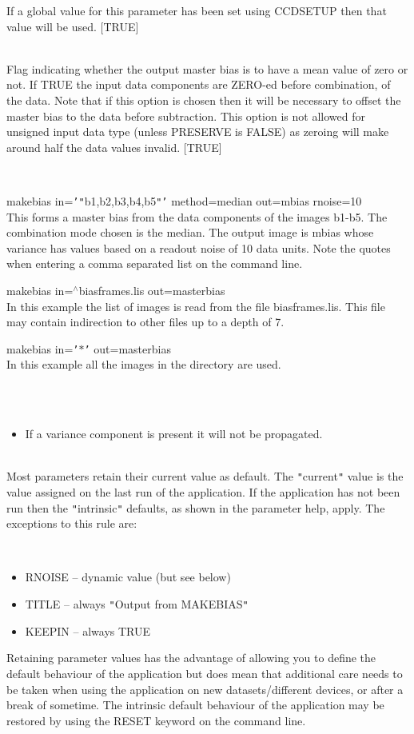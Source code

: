 \documentclass[twoside,11pt]{article}
\renewcommand{\_}{\texttt{\symbol{95}}}
\newcommand{\qt}[1]{{\tt "}#1{\tt "}}
\newcommand{\qs}[1]{{\tt '}#1{\tt '}}
\newcommand{\sstexamples}[1]{
   \item[Examples:] \mbox{} \\
   \vspace{-3.5ex}
   \begin{description}
      #1
   \end{description}
}
\newcommand{\sstsubsection}[1]{ \item[{#1}] \mbox{} \\}
\newcommand{\sstexamplesubsection}[2]{\sloppy \item{\ssttt #1} \mbox{} \\ #2 }
\newcommand{\sstnotes}[1]{\item[Notes:] \mbox{} \\[1.3ex] #1}
\newcommand{\sstdiytopic}[2]{\item[#1:] \mbox{} \\[1.3ex] #2}
\newcommand{\sstitemlist}[1]{
  \mbox{} \\
  \vspace{-3.5ex}
  \begin{itemize}
     #1
  \end{itemize}
}
\newcommand{\sstitem}{\item}
\newcommand{\sstexamples}[1]{
      \item[Examples:] \\
      \begin{description}
         #1
      \end{description}
      \\
   }
\newcommand{\sstsubsection}[1]{\item[{#1}]}
\newcommand{\sstexamplesubsection}[2]{\item[{\ssttt #1}] #2}
\newcommand{\sstnotes}[1]{\item[Notes:] #1 }
\newcommand{\sstdiytopic}[2]{\item[{#1}] #2 }
\newcommand{\sstitemlist}[1]{
      \begin{itemize}
         #1
      \end{itemize}
      \\
   }
\newcommand{\sstitem}{\item}
\begin{document}
{{{         If a global value for this parameter has been set using 
         CCDSETUP then that value will be used. 
         [TRUE]
      }
      \sstsubsection{
         ZERO = \_LOGICAL (Read)
      } {
         Flag indicating whether the output master bias is to have a
         mean value of zero or not. If TRUE the input data components
         are ZERO-ed before combination, of the data. Note that if
         this option is chosen then it will be necessary to offset the
         master bias to the data before subtraction. This option is
         not allowed for unsigned input data type (unless PRESERVE is
         FALSE) as zeroing will make around half the data values
         invalid.
         [TRUE]
      }
   }
   \sstexamples{
      \sstexamplesubsection{
         makebias in=\qs{\qt{b1,b2,b3,b4,b5}} method=median out=mbias rnoise=10
      } {
         This forms a master bias from the data components of the images
         b1-b5. The combination mode chosen is the median. The output
         image is mbias whose variance has values based on a readout
         noise of 10 data units. Note the quotes when entering a comma
         separated list on the command line.
      }
      \sstexamplesubsection{
         makebias in=$^\wedge$bias\_frames.lis out=master\_bias
      } {
         In this example the list of images is read from the file
         bias\_frames.lis. This file may contain indirection to other files
         up to a depth of 7.
      }
      \sstexamplesubsection{
         makebias in=\qs{$*$} out=master\_bias
      } {
         In this example all the images in the directory are used.
      }
   }
   \sstnotes{
      \sstitemlist{

         \sstitem
         If a variance component is present it will not be propagated.
      }
   }
   \sstdiytopic{
      Behaviour of parameters
   } {
      Most parameters retain their current value as default. The
      \qt{current} value is the value assigned on the last run of the
      application. If the application has not been run then the
      \qt{intrinsic} defaults, as shown in the parameter help, apply.
      The exceptions to this rule are:
      \sstitemlist{

         \sstitem
            RNOISE  -- dynamic value (but see below)

         \sstitem
            TITLE   -- always \qt{Output from MAKEBIAS}

         \sstitem
            KEEPIN  -- always TRUE

      }
      Retaining parameter values has the advantage of allowing you to
      define the default behaviour of the application but does mean
      that additional care needs to be taken when using the application
      on new datasets/different devices, or after a break of sometime.
      The intrinsic default behaviour of the application may be
      restored by using the RESET keyword on the command line.

}}
\end{document}
